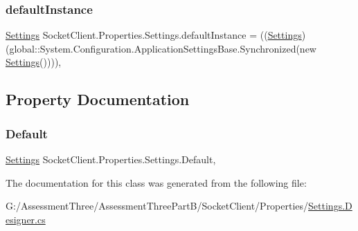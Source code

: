 \subsubsection{\texorpdfstring{default\+Instance}{defaultInstance}}
{\footnotesize\ttfamily \hyperlink{class_socket_client_1_1_properties_1_1_settings}{Settings} Socket\+Client.\+Properties.\+Settings.\+default\+Instance = ((\hyperlink{class_socket_client_1_1_properties_1_1_settings}{Settings})(global\+::\+System.\+Configuration.\+Application\+Settings\+Base.\+Synchronized(new \hyperlink{class_socket_client_1_1_properties_1_1_settings}{Settings}())))\hspace{0.3cm}{\ttfamily [static]}, {\ttfamily [private]}}



\subsection{Property Documentation}
\mbox{\label{class_socket_client_1_1_properties_1_1_settings_a052759b480879768820530ea7d850247}} 
\subsubsection{\texorpdfstring{Default}{Default}}
{\footnotesize\ttfamily \hyperlink{class_socket_client_1_1_properties_1_1_settings}{Settings} Socket\+Client.\+Properties.\+Settings.\+Default\hspace{0.3cm}{\ttfamily [static]}, {\ttfamily [get]}}



The documentation for this class was generated from the following file\+:\begin{DoxyCompactItemize}
\item 
G\+:/\+Assessment\+Three/\+Assessment\+Three\+Part\+B/\+Socket\+Client/\+Properties/\hyperlink{_socket_client_2_properties_2_settings_8_designer_8cs}{Settings.\+Designer.\+cs}\end{DoxyCompactItemize}
